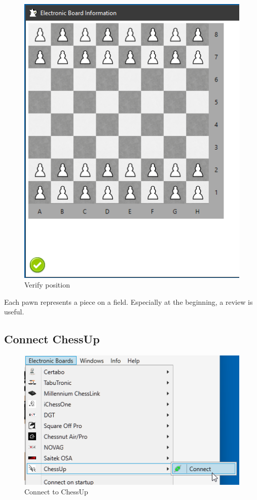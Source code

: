 \documentclass[11pt,a4paper]{article}
\begin{document}
\begin{figure}[H]
	\centering
	\includegraphics[scale=0.8]{Pegasus5.png}
	\caption{Verify position}
	\label{fig:SquareOffPro5}
\end{figure}

Each pawn represents a piece on a field. Especially at the beginning, a review is useful. 

\subsection{Connect ChessUp} \label{ConnectChessUp}
\begin{figure}[H]
	\centering
	\includegraphics[scale=1.0]{ChessUp1.png}
	\caption{Connect to ChessUp }
	\label{fig:ChessUp1}
\end{figure}
\end{document}
